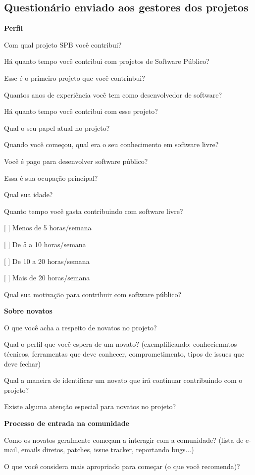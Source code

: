\begin{anexosenv}
\chapter{Questionário enviado aos gestores dos projetos}
\label{anexo d}

\textbf{Perfil}

Com qual projeto SPB você contribui?

Há quanto tempo você contribui com projetos de Software Público?

Esse é o primeiro projeto que você contrinbui?

Quantos anos de experiência você tem como desenvolvedor de software?

Há quanto tempo você contribui com esse projeto?

Qual o seu papel atual no projeto?

Quando você começou, qual era o seu conhecimento em software livre?

Você é pago para desenvolver software público?

Essa é sua ocupação principal?

Qual sua idade?

Quanto tempo você gasta contribuindo com software livre?

[ ] Menos de 5 horas/semana 

[ ] De 5 a 10 horas/semana

[ ] De 10 a 20 horas/semana

[ ] Mais de 20 horas/semana

Qual sua motivação para contribuir com software público?

\textbf{Sobre novatos}

O que você acha a respeito de novatos no projeto?

Qual o perfil que você espera de um novato? (exemplificando: conheciemntos técnicos, 
ferramentas que deve conhecer, comprometimento, tipos de issues que deve fechar)

Qual a maneira de identificar um novato que irá continuar contribuindo com o projeto?

Existe alguma atenção especial para novatos no projeto?

\textbf{Processo de entrada na comunidade}

Como os novatos geralmente começam a interagir com a comunidade? (lista de e-mail, 
emails diretos, patches, issue tracker, reportando bugs...)

O que você considera mais apropriado para começar (o que você recomenda)?


\end{anexosenv}
